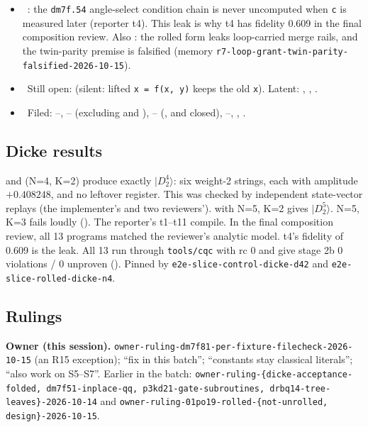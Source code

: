 \begin{itemize}[itemsep=1pt]
\item \fleak\ : the \texttt{dm7f.54} angle-select condition chain is never uncomputed when \texttt{c} is measured later (reporter t4). This leak is why t4 has fidelity 0.609 in the final composition review. Also : the rolled form leaks loop-carried merge rails, and the twin-parity premise is falsified (memory \texttt{r7-loop-grant-twin-parity-falsified-2026-10-15}).
\item \fconfirmed\ Still open:  (silent: lifted \texttt{x = f(x, y)} keeps the old \texttt{x}). Latent: , , .
\item \foverdecline\ Filed: --, -- (excluding  and ), -- (,  and  closed), --, , .
\end{itemize}

\subsection*{Dicke results}
 and  (N=4, K=2) produce exactly $|D^4_2\rangle$: six weight-2 strings, each with amplitude $+0.408248$, and no leftover register. This was checked by independent state-vector replays (the implementer's and two reviewers').  with N=5, K=2 gives $|D^5_2\rangle$. N=5, K=3 fails loudly (). The reporter's t1--t11 compile. In the final composition review, all 13 programs matched the reviewer's analytic model. t4's fidelity of 0.609 is the  leak. All 13 run through \texttt{tools/cqc} with rc 0 and give stage 2b 0 violations / 0 unproven (). Pinned by \texttt{e2e-slice-control-dicke-d42} and \texttt{e2e-slice-rolled-dicke-n4}.

\subsection*{Rulings}
\textbf{Owner (this session).} \texttt{owner-ruling-dm7f81-per-fixture-filecheck-2026-10-15} (an R15 exception); ``fix  in this batch''; ``constants stay classical literals''; ``also work on S5--S7''. Earlier in the batch: \texttt{owner-ruling-\{dicke-acceptance-folded, dm7f51-inplace-qq, p3kd21-gate-subroutines, drbq14-tree-leaves\}-2026-10-14} and \texttt{owner-ruling-01po19-rolled-\{not-unrolled, design\}-2026-10-15}.


